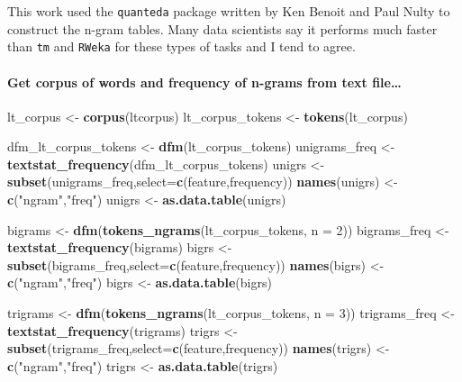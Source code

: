 \documentclass[
]{article}
\newenvironment{Shaded}{\begin{snugshade}}{\end{snugshade}}
\newcommand{\DataTypeTok}[1]{\textcolor[rgb]{0.13,0.29,0.53}{#1}}
\newcommand{\DecValTok}[1]{\textcolor[rgb]{0.00,0.00,0.81}{#1}}
\newcommand{\KeywordTok}[1]{\textcolor[rgb]{0.13,0.29,0.53}{\textbf{#1}}}
\newcommand{\NormalTok}[1]{#1}
\newcommand{\StringTok}[1]{\textcolor[rgb]{0.31,0.60,0.02}{#1}}
\begin{document}
This work used the \texttt{quanteda} package written by Ken Benoit and
Paul Nulty to construct the n-gram tables. Many data scientists say it
performs much faster than \texttt{tm} and \texttt{RWeka} for these types
of tasks and I tend to agree.

\hypertarget{get-corpus-of-words-and-frequency-of-n-grams-from-text-file}{%
\paragraph{Get corpus of words and frequency of n-grams from text
file\ldots{}}\label{get-corpus-of-words-and-frequency-of-n-grams-from-text-file}}

\begin{Shaded}
\begin{Highlighting}[]
\NormalTok{lt\_corpus \textless{}{-}}\StringTok{  }\KeywordTok{corpus}\NormalTok{(ltcorpus)}
\NormalTok{lt\_corpus\_tokens \textless{}{-}}\StringTok{ }\KeywordTok{tokens}\NormalTok{(lt\_corpus)}

\NormalTok{dfm\_lt\_corpus\_tokens \textless{}{-}}\StringTok{ }\KeywordTok{dfm}\NormalTok{(lt\_corpus\_tokens)}
\NormalTok{unigrams\_freq \textless{}{-}}\StringTok{ }\KeywordTok{textstat\_frequency}\NormalTok{(dfm\_lt\_corpus\_tokens)}
\NormalTok{unigrs \textless{}{-}}\StringTok{ }\KeywordTok{subset}\NormalTok{(unigrams\_freq,}\DataTypeTok{select=}\KeywordTok{c}\NormalTok{(feature,frequency))}
\KeywordTok{names}\NormalTok{(unigrs) \textless{}{-}}\StringTok{ }\KeywordTok{c}\NormalTok{(}\StringTok{"ngram"}\NormalTok{,}\StringTok{"freq"}\NormalTok{)}
\NormalTok{unigrs \textless{}{-}}\StringTok{ }\KeywordTok{as.data.table}\NormalTok{(unigrs)}

\NormalTok{bigrams \textless{}{-}}\StringTok{ }\KeywordTok{dfm}\NormalTok{(}\KeywordTok{tokens\_ngrams}\NormalTok{(lt\_corpus\_tokens, }\DataTypeTok{n =} \DecValTok{2}\NormalTok{))}
\NormalTok{bigrams\_freq \textless{}{-}}\StringTok{ }\KeywordTok{textstat\_frequency}\NormalTok{(bigrams)}
\NormalTok{bigrs \textless{}{-}}\StringTok{ }\KeywordTok{subset}\NormalTok{(bigrams\_freq,}\DataTypeTok{select=}\KeywordTok{c}\NormalTok{(feature,frequency))}
\KeywordTok{names}\NormalTok{(bigrs) \textless{}{-}}\StringTok{ }\KeywordTok{c}\NormalTok{(}\StringTok{"ngram"}\NormalTok{,}\StringTok{"freq"}\NormalTok{)}
\NormalTok{bigrs \textless{}{-}}\StringTok{ }\KeywordTok{as.data.table}\NormalTok{(bigrs)}

\NormalTok{trigrams \textless{}{-}}\StringTok{ }\KeywordTok{dfm}\NormalTok{(}\KeywordTok{tokens\_ngrams}\NormalTok{(lt\_corpus\_tokens, }\DataTypeTok{n =} \DecValTok{3}\NormalTok{))}
\NormalTok{trigrams\_freq \textless{}{-}}\StringTok{ }\KeywordTok{textstat\_frequency}\NormalTok{(trigrams)}
\NormalTok{trigrs \textless{}{-}}\StringTok{ }\KeywordTok{subset}\NormalTok{(trigrams\_freq,}\DataTypeTok{select=}\KeywordTok{c}\NormalTok{(feature,frequency))}
\KeywordTok{names}\NormalTok{(trigrs) \textless{}{-}}\StringTok{ }\KeywordTok{c}\NormalTok{(}\StringTok{"ngram"}\NormalTok{,}\StringTok{"freq"}\NormalTok{)}
\NormalTok{trigrs \textless{}{-}}\StringTok{ }\KeywordTok{as.data.table}\NormalTok{(trigrs)}


\end{Highlighting}
\end{Shaded}
\end{document}
